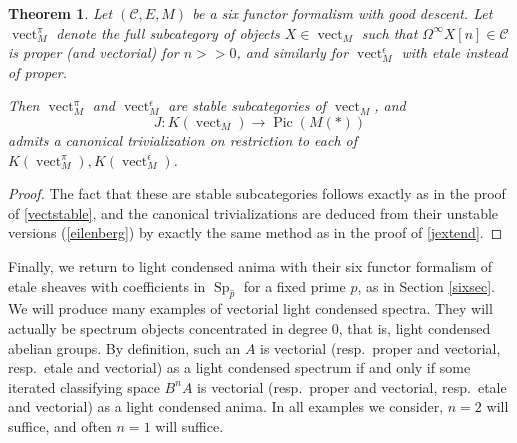 \documentclass[12pt]{article}
\newtheorem{theorem}{Theorem}[section]
\newcommand{\on}{\operatorname}
\newcommand{\mc}{\mathcal}
\newcommand{\wh}{\widehat}
\begin{document}
\begin{theorem}\label{eilenbergstable}
Let $(\mc{C},E,M)$ be a six functor formalism with good descent.  Let $\on{vect}_M^\pi$ denote the full subcategory of objects $X\in\on{vect}_M$ such that $\Omega^\infty X[n] \in\mc{C}$ is proper (and vectorial) for $n>>0$, and similarly for $\on{vect}_M^\epsilon$ with etale instead of proper.

Then $\on{vect}_M^\pi$ and $\on{vect}_M^\epsilon$ are stable subcategories of $\on{vect}_M$, and
$$J:K(\on{vect}_M)\to\on{Pic}(M(\ast))$$
admits a canonical trivialization on restriction to each of $K(\on{vect}_M^\pi),K(\on{vect}_M^\epsilon)$.
\end{theorem}
\begin{proof}
The fact that these are stable subcategories follows exactly as in the proof of \ref{vectstable}, and the canonical trivializations are deduced from their unstable versions (\ref{eilenberg}) by exactly the same method as in the proof of \ref{jextend}.
\end{proof}

Finally, we return to light condensed anima with their six functor formalism of etale sheaves with coefficients in $\on{Sp}_{\wh{p}}$ for a fixed prime $p$, as in Section \ref{sixsec}.  We will produce many examples of vectorial light condensed spectra.  They will actually be spectrum objects concentrated in degree $0$, that is, light condensed abelian groups.  By definition, such an $A$ is vectorial (resp.\ proper and vectorial, resp.\ etale and vectorial) as a light condensed spectrum if and only if some iterated classifying space $B^nA$ is vectorial (resp.\ proper and vectorial, resp.\ etale and vectorial) as a light condensed anima.  In all examples we consider, $n=2$ will suffice, and often $n=1$ will suffice.
\end{document}

